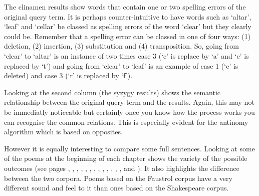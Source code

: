 The clinamen results show words that contain one or two spelling errors of the original query term. It is perhaps counter-intuitive to have words such as `altar', `leaf' and `cellar' be classed as spelling errors of the word `clear' but they clearly could be. Remember that a spelling error can be classed in one of four ways: (1) deletion, (2) insertion, (3) substitution and (4) transposition. So, going from `clear' to `altar' is an instance of two times case 3 (`c' is replace by `a' and `e' is replaced by `t') and going from  `clear' to `leaf' is an example of case 1 (`c' is deleted) and case 3 (`r' is replaced by `f').

Looking at the second column (the syzygy results) shows the semantic relationship between the original query term and the results. Again, this may not be immediatly noticeable but certainly once you know how the process works you can recognise the common relations. This is especially evident for the antinomy algorithm which is based on opposites.

\spirals

However it is equally interesting to compare some full sentences. Looking at some of the poems at the beginning of each chapter shows the variety of the possible outcomes (see pages \pageref{ch:introduction}, \pageref{ch:inspirations}, \pageref{ch:methodology}, \pageref{ch:pataphysics}, \pageref{ch:creativity}, \pageref{ch:technology}, \pageref{ch:evaluation}, \pageref{ch:foundations}, \pageref{ch:interpretation}, \pageref{ch:implementation}, \pageref{ch:applications}, \pageref{ch:analysis}, \pageref{ch:aspirations}, and \pageref{ch:observations}). It also highlights the difference between the two corpora. Poems based on the Faustrol corpus have a very different sound and feel to it than ones based on the Shakespeare corpus.

